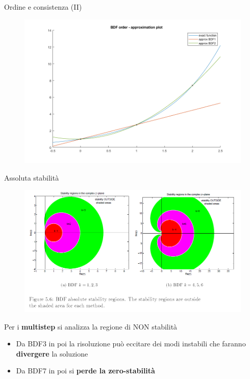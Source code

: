 \documentclass[aspectratio=169, 10pt, handout,usenames,dvipsnames]{beamer}
\begin{document}
\begin{frame}{Ordine e consistenza (II)}
        \begin{figure}
        \centering
        \includegraphics[width=.75\linewidth]{order.png}
        \label{fig:my_label}
        \end{figure}
 \end{frame}

 
    \begin{frame}{Assoluta stabilità}
        \begin{figure}
        \centering
        \includegraphics[width=.7\linewidth]{fig7.png}
        \label{fig:my_label}
        \end{figure}
        Per i \textbf{multistep} si analizza la regione di NON stabilità
        \begin{itemize}
            \item Da BDF3 in poi la risoluzione può eccitare dei modi instabili che faranno \textbf{divergere} la soluzione
            \item Da BDF7 in poi si \textbf{perde la zero-stabilità}
        \end{itemize}
    \end{frame}
    
\end{document}
